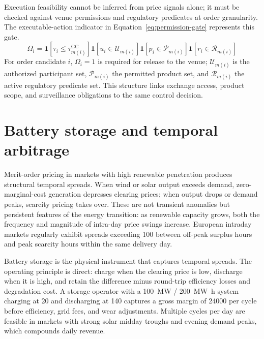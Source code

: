 \documentclass[oneside,10pt]{swissi}
\begin{document}
Execution feasibility cannot be inferred from price signals alone; it must be checked against venue permissions and regulatory predicates at order granularity. The executable-action indicator in Equation~\eqref{eq:permission-gate} represents this gate.
\begin{equation}
\Omega_i =
\mathbf{1}\!\left[\tau_i \le \tau^{\mathrm{GC}}_{m(i)}\right]
\mathbf{1}\!\left[u_i \in \mathcal{U}_{m(i)}\right]
\mathbf{1}\!\left[p_i \in \mathcal{P}_{m(i)}\right]
\mathbf{1}\!\left[r_i \in \mathcal{R}_{m(i)}\right]
\label{eq:permission-gate}
\end{equation}
For order candidate $i$, $\Omega_i=1$ is required for release to the venue; $\mathcal{U}_{m(i)}$ is the authorized participant set, $\mathcal{P}_{m(i)}$ the permitted product set, and $\mathcal{R}_{m(i)}$ the active regulatory predicate set. This structure links exchange access, product scope, and surveillance obligations to the same control decision.\cite{acer_nemo_designation_2026,eu_reg_2011_1227_remit,eu_dir_2014_65_mifid2,eu_reg_2014_600_mifir,eu_reg_2012_648_emir}

\section{Battery storage and temporal arbitrage}
Merit-order pricing in markets with high renewable penetration produces structural temporal spreads. When wind or solar output exceeds demand, zero-marginal-cost generation depresses clearing prices; when output drops or demand peaks, scarcity pricing takes over. These are not transient anomalies but persistent features of the energy transition: as renewable capacity grows, both the frequency and magnitude of intra-day price swings increase. European intraday markets regularly exhibit spreads exceeding \qty{100}{} between off-peak surplus hours and peak scarcity hours within the same delivery day.\cite{nord_pool_intraday_2026,nord_pool_day_ahead_2026}

Battery storage is the physical instrument that captures temporal spreads. The operating principle is direct: charge when the clearing price is low, discharge when it is high, and retain the difference minus round-trip efficiency losses and degradation cost. A storage operator with a \qty{100}{\mega\watt} / \qty{200}{\mega\watt\hour} system charging at \qty{20}{} and discharging at \qty{140}{} captures a gross margin of \qty{24000}{} per cycle before efficiency, grid fees, and wear adjustments. Multiple cycles per day are feasible in markets with strong solar midday troughs and evening demand peaks, which compounds daily revenue.
\end{document}
